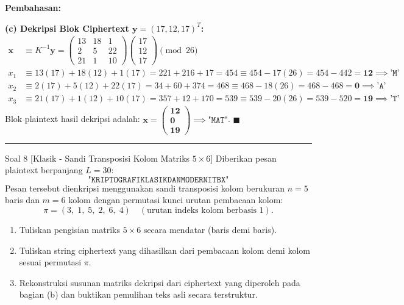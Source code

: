 \documentclass[11pt,a4paper]{article}
\newenvironment{solusi}{\noindent\textbf{\textsf{Pembahasan:}}\par\vspace{0.2em}}{\hfill$\blacksquare$\vspace{1em}\par\hrule\vspace{1em}}
\begin{document}
\begin{solusi}
\vspace{0.2cm}
\textbf{(c) Dekripsi Blok Ciphertext $\mathbf{y} = (17, 12, 17)^T$:}
\begin{align*}
\mathbf{x} &\equiv K^{-1} \mathbf{y} = \begin{pmatrix} 13 & 18 & 1 \\ 2 & 5 & 22 \\ 21 & 1 & 10 \end{pmatrix} \begin{pmatrix} 17 \\ 12 \\ 17 \end{pmatrix} \pmod{26} \\
x_1 &\equiv 13(17) + 18(12) + 1(17) = 221 + 216 + 17 = 454 \equiv 454 - 17(26) = 454 - 442 = \mathbf{12} \implies \texttt{'M'} \\
x_2 &\equiv 2(17) + 5(12) + 22(17) = 34 + 60 + 374 = 468 \equiv 468 - 18(26) = 468 - 468 = \mathbf{0} \implies \texttt{'A'} \\
x_3 &\equiv 21(17) + 1(12) + 10(17) = 357 + 12 + 170 = 539 \equiv 539 - 20(26) = 539 - 520 = \mathbf{19} \implies \texttt{'T'}
\end{align*}
Blok plaintext hasil dekripsi adalah: $\mathbf{\mathbf{x} = \begin{pmatrix} 12 \\ 0 \\ 19 \end{pmatrix} \implies \texttt{"MAT"}}$.
\end{solusi}


\begin{soalklasik}{Soal 8 [Klasik - Sandi Transposisi Kolom Matriks $5 \times 6$]}
Diberikan pesan plaintext berpanjang $L = 30$:
\[
\texttt{"KRIPTOGRAFIKLASIKDANMODERNITBX"}
\]
Pesan tersebut dienkripsi menggunakan sandi transposisi kolom berukuran $n = 5$ baris dan $m = 6$ kolom dengan permutasi kunci urutan pembacaan kolom:
\[
\pi = (3, \; 1, \; 5, \; 2, \; 6, \; 4) \quad (\text{urutan indeks kolom berbasis 1}).
\]
\begin{enumerate}[label=(\alph*)]
    \item Tuliskan pengisian matriks $5 \times 6$ secara mendatar (baris demi baris).
    \item Tuliskan string ciphertext yang dihasilkan dari pembacaan kolom demi kolom sesuai permutasi $\pi$.
    \item Rekonstruksi susunan matriks dekripsi dari ciphertext yang diperoleh pada bagian (b) dan buktikan pemulihan teks asli secara terstruktur.
\end{enumerate}
\end{soalklasik}
\end{document}
